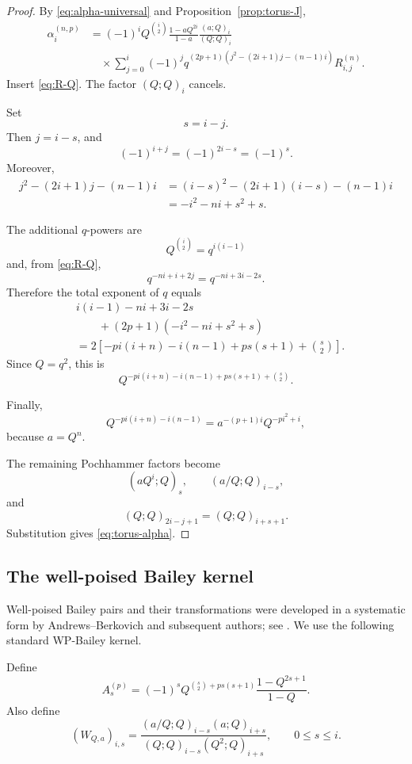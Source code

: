 \documentclass[11pt]{amsart}
\begin{document}
\begin{proof}
By \eqref{eq:alpha-universal} and
Proposition~\ref{prop:torus-J},
\begin{align*}
\alpha_i^{(n,p)}
&=
(-1)^iQ^{\binom{i}{2}}
\frac{1-aQ^{2i}}{1-a}
\frac{(a;Q)_i}{(Q;Q)_i}
\\
&\quad\times
\sum_{j=0}^{i}
(-1)^j
q^{(2p+1)
(j^2-(2i+1)j-(n-1)i)}
R_{i,j}^{(n)}.
\end{align*}
Insert \eqref{eq:R-Q}.
The factor \((Q;Q)_i\) cancels.

Set
\[
s=i-j.
\]
Then \(j=i-s\), and
\[
(-1)^{i+j}
=
(-1)^{2i-s}
=
(-1)^s.
\]
Moreover,
\begin{align}
j^2-(2i+1)j-(n-1)i
&=
(i-s)^2-(2i+1)(i-s)-(n-1)i
\nonumber\\
&=
-i^2-ni+s^2+s.
\end{align}

The additional \(q\)-powers are
\[
Q^{\binom{i}{2}}
=
q^{i(i-1)}
\]
and, from \eqref{eq:R-Q},
\[
q^{-ni+i+2j}
=
q^{-ni+3i-2s}.
\]
Therefore the total exponent of \(q\) equals
\begin{align*}
&i(i-1)-ni+3i-2s
\\
&\qquad
+(2p+1)(-i^2-ni+s^2+s)
\\
&=
2\left[
-pi(i+n)-i(n-1)
+ps(s+1)+\binom{s}{2}
\right].
\end{align*}
Since \(Q=q^2\), this is
\[
Q^{-pi(i+n)-i(n-1)
+ps(s+1)+\binom{s}{2}}.
\]

Finally,
\[
Q^{-pi(i+n)-i(n-1)}
=
a^{-(p+1)i}Q^{-pi^2+i},
\]
because \(a=Q^n\).

The remaining Pochhammer factors become
\[
(aQ^i;Q)_s,
\qquad
(a/Q;Q)_{i-s},
\]
and
\[
(Q;Q)_{2i-j+1}
=
(Q;Q)_{i+s+1}.
\]
Substitution gives \eqref{eq:torus-alpha}.
\end{proof}


\subsection{The well-poised Bailey kernel}
\label{sec:wp}

Well-poised Bailey pairs and their transformations were developed in a
systematic form by Andrews--Berkovich and subsequent authors; see
\cite{AndrewsBerkovich,McLaughlin,Warnaar}. 
 We use the following standard WP-Bailey kernel.



Define
\begin{equation}\label{eq:A-p}
A_s^{(p)}
=
(-1)^s
Q^{\binom{s}{2}+ps(s+1)}
\frac{1-Q^{2s+1}}{1-Q}.
\end{equation}
Also define
\begin{equation}\label{eq:W-matrix}
(W_{Q,a})_{i,s}
=
\frac{
(a/Q;Q)_{i-s}(a;Q)_{i+s}
}{
(Q;Q)_{i-s}(Q^2;Q)_{i+s}
},
\qquad
0\leq s\leq i.
\end{equation}
\end{document}
